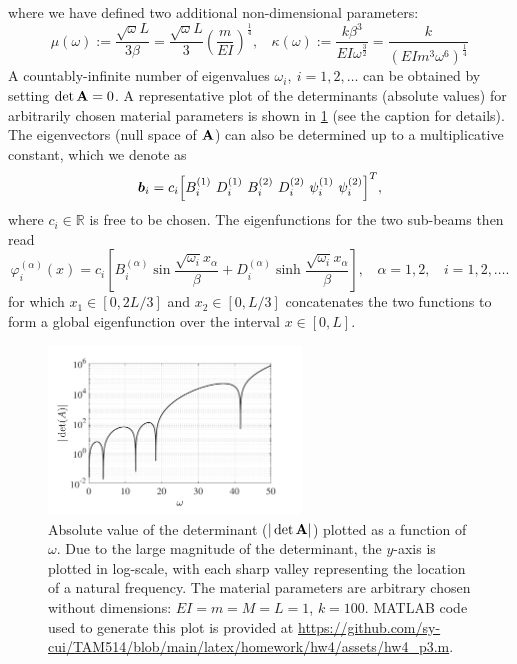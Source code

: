 where we have defined two additional non-dimensional parameters:
\begin{equation}
    \mu(\omega) := \frac{\sqrt{\omega}L}{3\beta} = \frac{\sqrt{\omega} L}{3} {\left(\frac{m}{EI}\right)}^{\frac{1}{4}}, ~~~~ \kappa(\omega) := \frac{k\beta^3}{EI\omega^{\frac{3}{2}}} = \frac{k}{{\left(EIm^3 \omega^6 \right)}^{\frac{1}{4}}}
\end{equation}
A countably-infinite number of eigenvalues $\omega_i, ~i=1,2,\ldots$ can be obtained by setting $\det \mathbf{A} = 0$.
A representative plot of the determinants (absolute values) for arbitrarily chosen material parameters is shown in \cref{fig:hw4_p3_detA} (see the caption for details).
The eigenvectors (null space of $\mathbf{A}$) can also be determined up to a multiplicative constant, which we denote as 
\begin{equation}
    \bm{b}_i = c_i {\left[B^{(1)}_i ~D^{(1)}_i ~B^{(2)}_i ~D^{(2)}_i ~\psi^{(1)}_i ~\psi^{(2)}_i\right]}^T,
\end{equation}
where $c_i \in \mathbb{R}$ is free to be chosen. 
The eigenfunctions for the two sub-beams then read 
\begin{equation}
    \boxed{\varphi_i^{(\alpha)}(x) = c_i\left[B_i^{(\alpha)} \sin\frac{\sqrt{\omega_i}x_\alpha}{\beta} + D_i^{(\alpha)} \sinh\frac{\sqrt{\omega_i}x_\alpha}{\beta} \right]}, ~~~~ \alpha = 1, 2, ~~~~ i = 1, 2, \ldots.
\end{equation}
for which $x_1 \in [0, 2L/3]$ and $x_2 \in [0, L/3]$ concatenates the two functions to form a global eigenfunction over the interval $x \in [0, L]$.
\begin{figure}[!ht]
    \centering
    \includegraphics[width=0.6\textwidth]{homework/hw4/assets/hw4_p3_detA.pdf}
    \caption{
        Absolute value of the determinant ($| \det\mathbf{A} |$) plotted as a function of $\omega$.
        Due to the large magnitude of the determinant, the $y$-axis is plotted in log-scale, with each sharp valley representing the location of a natural frequency. 
        The material parameters are arbitrary chosen without dimensions: $EI = m = M = L = 1$, $k = 100$.
        MATLAB code used to generate this plot is provided at \url{https://github.com/sy-cui/TAM514/blob/main/latex/homework/hw4/assets/hw4_p3.m}.
    }\label{fig:hw4_p3_detA}
\end{figure}

